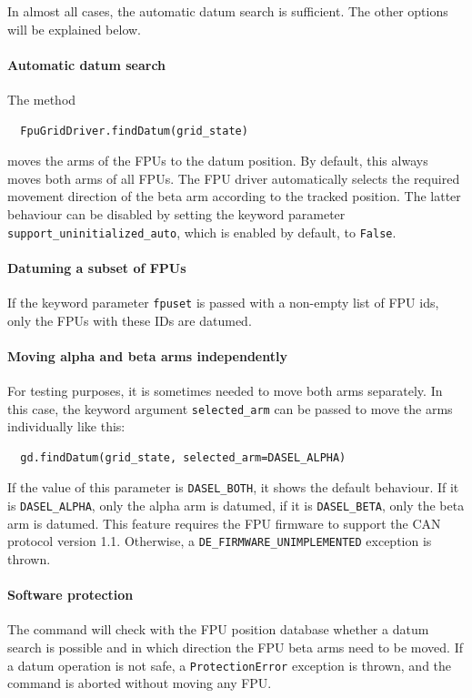 \documentclass[11pt,a4paper]{report}
\begin{document}
In almost all cases, the automatic datum search is sufficient.  The
other options will be explained below.

\paragraph{Automatic datum search}

The method
\begin{verbatim}
  FpuGridDriver.findDatum(grid_state)
\end{verbatim}
moves the arms of the FPUs to the datum position.  By default, this
always moves both arms of all FPUs. The FPU driver automatically
selects the required movement direction of the beta arm according to
the tracked position. The latter behaviour can be disabled by setting
the keyword parameter \texttt{support\_uninitialized\_auto}, which is
enabled by default, to \texttt{False}.

\paragraph{Datuming a subset of FPUs}

If the keyword parameter \texttt{fpuset} is passed with a non-empty
list of FPU ids, only the FPUs with these IDs are datumed.


\paragraph{Moving alpha and beta arms independently}

For testing purposes, it is sometimes needed to move both arms
separately.  In this case, the keyword argument
\texttt{selected\_arm} can be passed to move the arms individually
like this:

\begin{verbatim}
  gd.findDatum(grid_state, selected_arm=DASEL_ALPHA)
\end{verbatim}

\begin{sloppypar}
If the value of this parameter is \texttt{DASEL\_BOTH}, it shows the
default behaviour. If it is \texttt{DASEL\_ALPHA}, only the alpha arm
is datumed, if it is \texttt{DASEL\_BETA}, only the beta arm is
datumed. This feature requires the FPU firmware to support the CAN
protocol version 1.1. Otherwise, a
\texttt{DE\_FIRMWARE\_UNIMPLEMENTED} exception is thrown.
\end{sloppypar}

\paragraph{Software protection}
The command will check with the FPU position database whether a datum
search is possible and in which direction the FPU beta arms need to be
moved. If a datum operation is not safe, a \texttt{ProtectionError}
exception is thrown, and the command is aborted without moving any
FPU.
\end{document}
